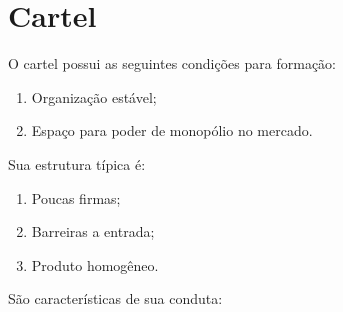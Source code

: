 \documentclass[12pt,a4paper,oneside,brazil]{abntex2}
\begin{document}
\section{Cartel} %
\label{sec:cartel}

O cartel possui as seguintes condições para formação:

\begin{enumerate}
	\item Organização estável;
	\item Espaço para poder de monopólio no mercado.
\end{enumerate}

Sua estrutura típica é:
\begin{enumerate}
	\item Poucas firmas;
	\item Barreiras a entrada;
	\item Produto homogêneo.
\end{enumerate}

São características de sua conduta:
\end{document}
